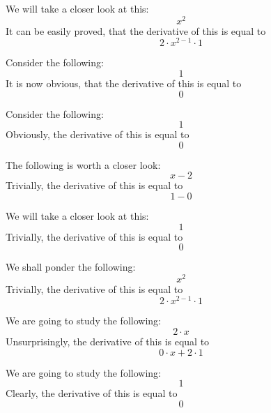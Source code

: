 \documentclass{article}
\begin{document}
We will take a closer look at this:
\begin{equation}
x ^{2 } 
\end{equation}
It can be easily proved, that the derivative of this is equal to
\begin{equation}
2 \cdot x ^{2 - 1 } \cdot 1 
\end{equation}

Consider the following:
\begin{equation}
1 
\end{equation}
It is now obvious, that the derivative of this is equal to
\begin{equation}
0 
\end{equation}

Consider the following:
\begin{equation}
1 
\end{equation}
Obviously, the derivative of this is equal to
\begin{equation}
0 
\end{equation}

The following is worth a closer look:
\begin{equation}
x - 2 
\end{equation}
Trivially, the derivative of this is equal to
\begin{equation}
1 - 0 
\end{equation}

We will take a closer look at this:
\begin{equation}
1 
\end{equation}
Trivially, the derivative of this is equal to
\begin{equation}
0 
\end{equation}

We shall ponder the following:
\begin{equation}
x ^{2 } 
\end{equation}
Trivially, the derivative of this is equal to
\begin{equation}
2 \cdot x ^{2 - 1 } \cdot 1 
\end{equation}

We are going to study the following:
\begin{equation}
2 \cdot x 
\end{equation}
Unsurprisingly, the derivative of this is equal to
\begin{equation}
0 \cdot x + 2 \cdot 1 
\end{equation}

We are going to study the following:
\begin{equation}
1 
\end{equation}
Clearly, the derivative of this is equal to
\begin{equation}
0 
\end{equation}
\end{document}
